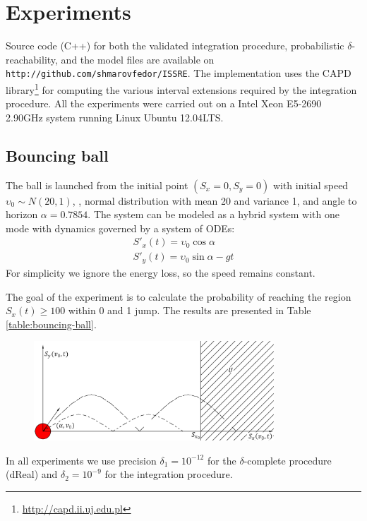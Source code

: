 \section{Experiments}
Source code (C++) for both the validated integration procedure, probabilistic $\delta$-reachability, 
and the model files are available on \texttt{http://github.com/shmarovfedor/ISSRE}. 
The implementation uses the CAPD library\footnote{\url{http://capd.ii.uj.edu.pl}} for computing 
the various interval extensions required by the integration procedure. All the experiments were
carried out on a Intel Xeon E5-2690 2.90GHz system running Linux Ubuntu 12.04LTS.
\subsection{Bouncing ball}
The ball is launched from the initial point $(S_{x} = 0, S_{y} = 0)$ with initial speed 
$\upsilon_0 \sim N(20,1)$, \ie, normal distribution with mean 20 and variance 1, and angle 
to horizon $\alpha = 0.7854$. The system can be modeled as a hybrid system with one mode with 
dynamics governed by a system of ODEs: 
\[
\begin{array}{l}
S'_{x}(t) = \upsilon_0 \cos{\alpha} \\[1ex]
S'_{y}(t) = \upsilon_0 \sin{\alpha} - gt
\end{array}
\]
For simplicity we ignore the energy loss, so the speed remains constant.

The goal of the experiment is to calculate the probability of reaching the region 
$S_{x}(t) \ge 100$ within 0 and 1 jump. The results are presented in Table \ref{table:bouncing-ball}.

\begin{figure}[ht!] 
	\centering
	\includegraphics[width=90mm]{bouncing-ball-k-1-random-speed.png}
\end{figure}

\begin{remark}
In all experiments we use precision $\delta_1 = 10^{-12}$ for the $\delta$-complete 
procedure (dReal) and $\delta_2 = 10^{-9}$ for the integration procedure.
\end{remark}

